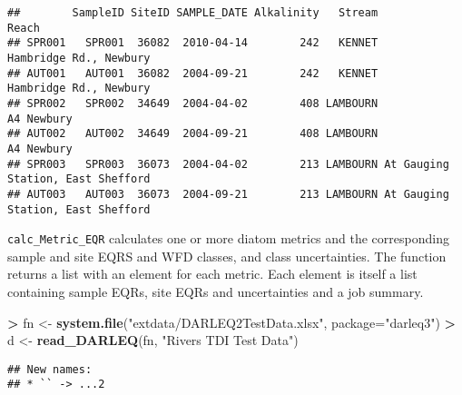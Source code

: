 \documentclass[
]{article}
\newenvironment{Shaded}{\begin{snugshade}}{\end{snugshade}}
\newcommand{\DataTypeTok}[1]{\textcolor[rgb]{0.13,0.29,0.53}{#1}}
\newcommand{\DecValTok}[1]{\textcolor[rgb]{0.00,0.00,0.81}{#1}}
\newcommand{\KeywordTok}[1]{\textcolor[rgb]{0.13,0.29,0.53}{\textbf{#1}}}
\newcommand{\NormalTok}[1]{#1}
\newcommand{\OperatorTok}[1]{\textcolor[rgb]{0.81,0.36,0.00}{\textbf{#1}}}
\newcommand{\StringTok}[1]{\textcolor[rgb]{0.31,0.60,0.02}{#1}}
\begin{document}
\begin{Shaded}
\end{Shaded}

\begin{verbatim}
##        SampleID SiteID SAMPLE_DATE Alkalinity   Stream                             Reach
## SPR001   SPR001  36082  2010-04-14        242   KENNET            Hambridge Rd., Newbury
## AUT001   AUT001  36082  2004-09-21        242   KENNET            Hambridge Rd., Newbury
## SPR002   SPR002  34649  2004-04-02        408 LAMBOURN                        A4 Newbury
## AUT002   AUT002  34649  2004-09-21        408 LAMBOURN                        A4 Newbury
## SPR003   SPR003  36073  2004-04-02        213 LAMBOURN At Gauging Station, East Shefford
## AUT003   AUT003  36073  2004-09-21        213 LAMBOURN At Gauging Station, East Shefford
\end{verbatim}

\texttt{calc\_Metric\_EQR} calculates one or more diatom metrics and the
corresponding sample and site EQRS and WFD classes, and class
uncertainties. The function returns a list with an element for each
metric. Each element is itself a list containing sample EQRs, site EQRs
and uncertainties and a job summary.

\begin{Shaded}
\begin{Highlighting}[]
\OperatorTok{>}\StringTok{ }\NormalTok{fn <-}\StringTok{ }\KeywordTok{system.file}\NormalTok{(}\StringTok{"extdata/DARLEQ2TestData.xlsx"}\NormalTok{, }\DataTypeTok{package=}\StringTok{"darleq3"}\NormalTok{)}
\OperatorTok{>}\StringTok{ }\NormalTok{d <-}\StringTok{ }\KeywordTok{read_DARLEQ}\NormalTok{(fn, }\StringTok{"Rivers TDI Test Data"}\NormalTok{)}
\end{Highlighting}
\end{Shaded}

\begin{verbatim}
## New names:
## * `` -> ...2
\end{verbatim}

\begin{Shaded}
\end{Shaded}
\end{document}

